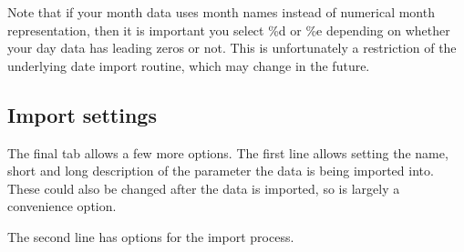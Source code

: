 Note that if your month data uses month names instead of numerical
month representation, then it is important you select \%d or \%e
depending on whether your day data has leading zeros or not.  This is
unfortunately a restriction of the underlying date import routine,
which may change in the future.

\subsection{Import settings}

The final tab allows a few more options. The first line allows setting
the name, short and long description of the parameter the data is
being imported into. These could also be changed after the data is
imported, so is largely a convenience option.

The second line has options for the import process.

